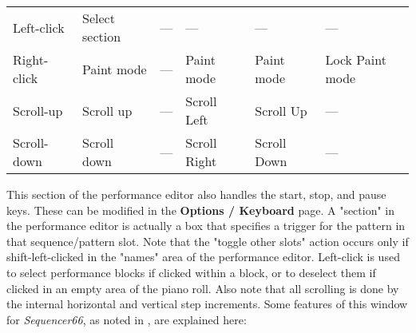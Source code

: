 \begin{table}[H]
\begin{tabular}{l l l l l l}
         Left-click        & Select section  & ---                & ---                & ---             & ---                \\
         Right-click       & Paint mode      & ---                & Paint mode         & Paint mode      & Lock Paint mode    \\
         Scroll-up         & Scroll up       & ---                & Scroll Left        & Scroll Up       & ---                \\
         Scroll-down       & Scroll down     & ---                & Scroll Right       & Scroll Down     & ---                \\
      \end{tabular}
   \end{table}

   This section of the performance editor also handles the start, stop, and
   pause keys.  These can be modified in the \textbf{Options / Keyboard} page.
   A "section" in the performance editor is actually a box that
   specifies a trigger for the pattern in that sequence/pattern slot.
   Note that the "toggle other slots" action occurs only if shift-left-clicked
   in the "names" area of the performance editor.
   Left-click is used to select performance blocks if clicked within
   a block, or to deselect them if clicked in an empty area of the piano roll.
   Also note that all scrolling is done by the internal horizontal and vertical
   step increments.
   Some features of this window for \textsl{Sequencer66},
   as noted in , are explained here:

